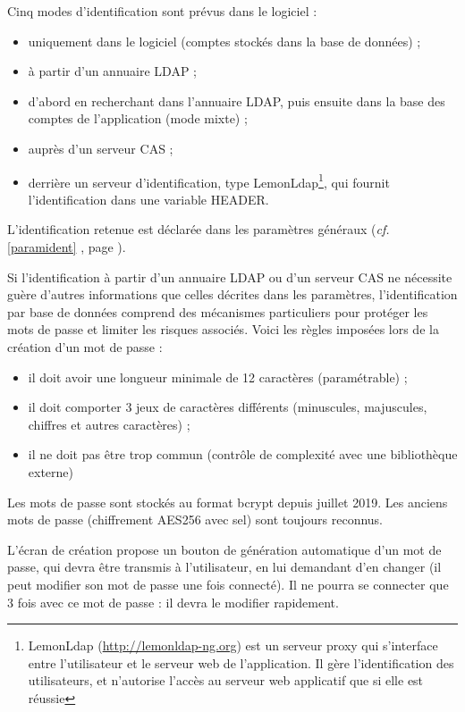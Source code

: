 Cinq modes d'identification sont prévus dans le logiciel :
\begin{itemize}
\item uniquement dans le logiciel (comptes stockés dans la base de données) ;
\item à partir d'un annuaire LDAP ;
\item d'abord en recherchant dans l'annuaire LDAP, puis ensuite dans la base des comptes de l'application (mode mixte) ;
\item auprès d'un serveur CAS ;
\item derrière un serveur d'identification, type LemonLdap\footnote{LemonLdap (\url{http://lemonldap-ng.org}) est un serveur proxy qui s'interface entre l'utilisateur et le serveur web de l'application. Il gère l'identification des utilisateurs, et n'autorise l'accès au serveur web applicatif que si elle est réussie}, qui fournit l'identification dans une variable HEADER.
\end{itemize}

L'identification retenue est déclarée dans les paramètres généraux (\textit{cf.} \ref{paramident} \textit{}, page \pageref{paramident}).

Si l'identification à partir d'un annuaire LDAP ou d'un serveur CAS ne nécessite guère d'autres informations que celles décrites dans les paramètres, l'identification par base de données comprend des mécanismes particuliers pour protéger les mots de passe et limiter les risques associés. Voici les règles imposées lors de la création d'un mot de passe : 
\begin{itemize}
\item il doit avoir une longueur minimale de 12 caractères (paramétrable) ;
\item il doit comporter 3 jeux de caractères différents (minuscules, majuscules, chiffres et autres caractères) ;
\item il ne doit pas être trop commun (contrôle de complexité avec une bibliothèque externe)
\end{itemize}

Les mots de passe sont stockés au format bcrypt depuis juillet 2019. Les anciens mots de passe (chiffrement AES256 avec sel) sont toujours reconnus.

L'écran de création propose un bouton de génération automatique d'un mot de passe, qui devra être transmis à l'utilisateur, en lui demandant d'en changer (il peut modifier son mot de passe une fois connecté). Il ne pourra se connecter que 3 fois avec ce mot de passe : il devra le modifier rapidement.

